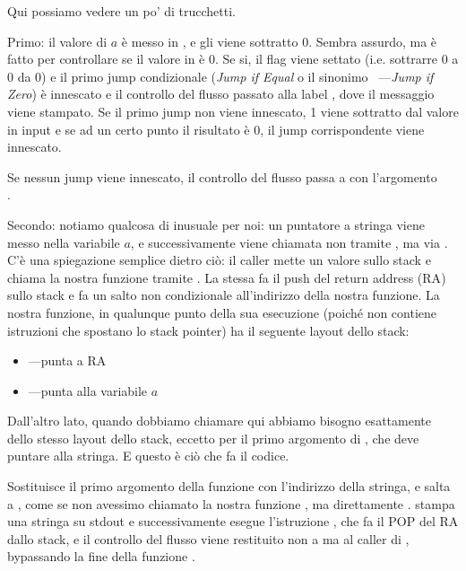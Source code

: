 Qui possiamo vedere un po' di trucchetti.


Primo: il valore di $a$ è messo in \EAX, e gli viene sottratto 0. Sembra assurdo, ma è fatto per controllare se il valore 
in \EAX è 0. Se si, il flag \ZF viene settato (i.e. sottrarre 0 a 0 da 0)
e il primo jump condizionale \JE (\emph{Jump if Equal} o il sinonimo \JZ~---\emph{Jump if Zero}) è innescato e il controllo del flusso 
passato alla label , dove il messaggio  viene stampato. 
Se il primo jump non viene innescato, 1 viene sottratto dal valore in input e se ad un certo punto il risultato è 0, il jump corrispondente
viene innescato.

Se nessun jump viene innescato, il controllo del flusso passa a \printf con l'argomento \\
.

\label{jump_to_last_printf}
\myindex{\Stack}

Secondo: notiamo qualcosa di inusuale per noi: un puntatore a stringa viene messo nella variabile $a$, e 
successivamente viene chiamata \printf non tramite \CALL, ma via \JMP. C'è una spiegazione semplice dietro ciò: 
il \gls{caller} mette un valore sullo stack e chiama la nostra funzione tramite \CALL. 
La stessa \CALL fa il push del return address (\ac{RA}) sullo stack e fa un salto non condizionale all'indirizzo della nostra funzione. 
La nostra funzione, in qualunque punto della sua esecuzione (poiché non contiene istruzioni che spostano lo stack pointer)
ha il seguente layout dello stack:

\begin{itemize}
\item\ESP---punta a \ac{RA}
\item{}---punta alla variabile $a$ 
\end{itemize}

Dall'altro lato, quando dobbiamo chiamare \printf qui abbiamo bisogno esattamente dello stesso layout dello stack,
eccetto per il primo argomento di \printf, che deve puntare alla stringa. 
E questo è ciò che fa il codice.

Sostituisce il primo argomento della funzione con l'indirizzo della stringa, e salta a \printf, come se non avessimo chiamato
la nostra funzione \ttf, ma direttamente \printf.
\printf stampa una stringa su \gls{stdout} e successivamente esegue l'istruzione \RET , che fa il POP del 
\ac{RA} dallo stack, e il controllo del flusso viene restituito non a \ttf ma al \gls{caller} di \ttf, 
bypassando la fine della funzione \ttf.

